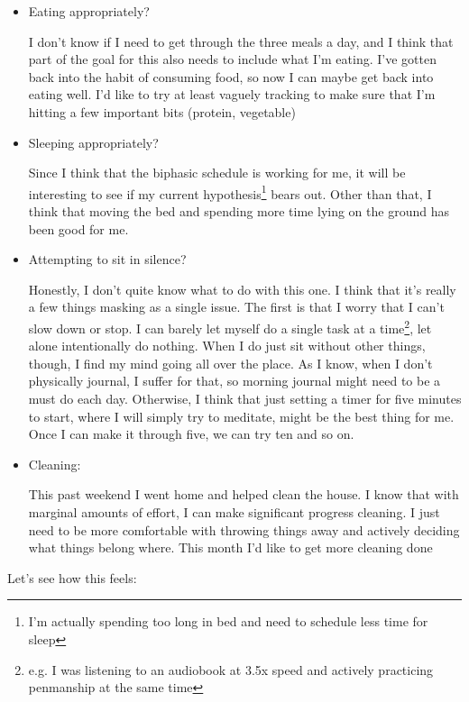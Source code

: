 \documentclass[12pt]{article}
\renewcommand{\,}{\textsuperscript{,}}
\begin{document}
\begin{itemize}

\item Eating appropriately?

I don't know if I need to get through the three meals a day, and I think that part of the goal for this also needs to include what I'm eating.  
I've gotten back into the habit of consuming food, so now I can maybe get back into eating well.  
I'd like to try at least vaguely tracking to make sure that I'm hitting a few important bits (protein, vegetable)

\item Sleeping appropriately?

Since I think that the biphasic schedule is working for me, it will be interesting to see if my current hypothesis\footnote{I'm actually spending too long in bed and need to schedule less time for sleep} bears out.  
Other than that, I think that moving the bed and spending more time lying on the ground has been good for me.

\item Attempting to sit in silence?

Honestly, I don't quite know what to do with this one.  
I think that it's really a few things masking as a single issue.  
The first is that I worry that I can't slow down or stop.  
I can barely let myself do a single task at a time\footnote{e.g. I was listening to an audiobook at 3.5x speed and actively practicing penmanship at the same time}, let alone intentionally do nothing.  
When I do just sit without other things, though, I find my mind going all over the place.  
As I know, when I don't physically journal, I suffer for that, so morning journal might need to be a must do each day.  
Otherwise, I think that just setting a timer for five minutes to start, where I will simply try to meditate, might be the best thing for me.  
Once I can make it through five, we can try ten and so on.

\item Cleaning:

This past weekend I went home and helped clean the house. I know that with marginal amounts of effort, I can make significant progress cleaning. I just need to be more comfortable with throwing things away and actively deciding what things belong where.  
This month I'd like to get more cleaning done

\end{itemize}

Let's see how this feels:
\end{document}
